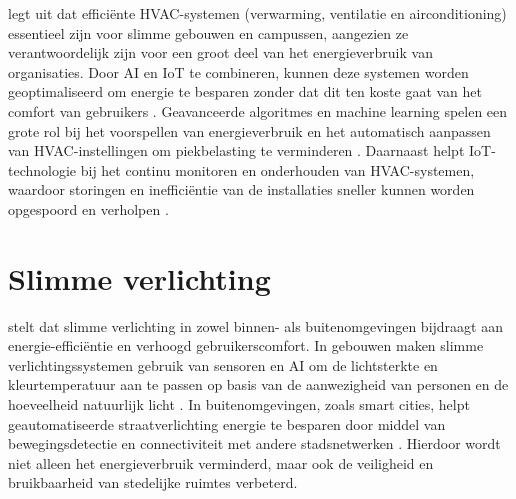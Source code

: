 \textcite{Correia2022} legt uit dat efficiënte HVAC-systemen (verwarming, ventilatie en airconditioning) essentieel zijn voor slimme gebouwen en campussen, aangezien ze verantwoordelijk zijn voor een groot deel van het energieverbruik van organisaties. Door AI en IoT te combineren, kunnen deze systemen worden geoptimaliseerd om energie te besparen zonder dat dit ten koste gaat van het comfort van gebruikers \autocite{Min_Allah_2020}. Geavanceerde algoritmes en machine learning spelen een grote rol bij het voorspellen van energieverbruik en het automatisch aanpassen van HVAC-instellingen om piekbelasting te verminderen \autocite{Khoa2020}. Daarnaast helpt IoT-technologie bij het continu monitoren en onderhouden van HVAC-systemen, waardoor storingen en inefficiëntie van de installaties sneller kunnen worden opgespoord en verholpen \autocite{Zhang2022}.




\section{Slimme verlichting}

\textcite{Poyyamozhi2024} stelt dat slimme verlichting in zowel binnen- als buitenomgevingen bijdraagt aan energie-efficiëntie en verhoogd gebruikerscomfort. In gebouwen maken slimme verlichtingssystemen gebruik van sensoren en AI om de lichtsterkte en kleurtemperatuur aan te passen op basis van de aanwezigheid van personen en de hoeveelheid natuurlijk licht \autocite{Wang2024}. In buitenomgevingen, zoals smart cities, helpt geautomatiseerde straatverlichting energie te besparen door middel van bewegingsdetectie en connectiviteit met andere stadsnetwerken \autocite{Huseien_2022}. Hierdoor wordt niet alleen het energieverbruik verminderd, maar ook de veiligheid en bruikbaarheid van stedelijke ruimtes verbeterd.  





